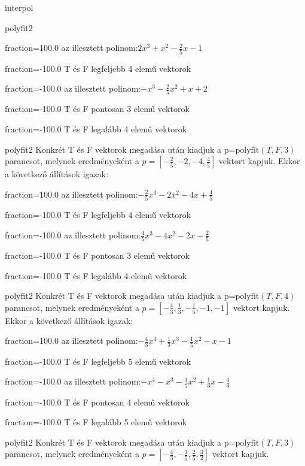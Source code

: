 \documentclass[12pt]{article}
\begin{document}
\begin{quiz}{interpol}
\begin{multi}[multiple]{polyfit2}
\item[fraction=100.0] az illesztett polinom:$2x^3+x^2-\frac{2}{5}x-1$
\item[fraction=-100.0]  T és F legfeljebb 4 elemű vektorok
\item[fraction=-100.0]  az illesztett polinom:$-x^3-\frac{2}{5}x^2+x+2$
\item[fraction=-100.0]  T és F pontosan 3 elemű vektorok
\item[fraction=-100.0] T és F legalább 4 elemű vektorok
\end{multi}
\begin{multi}[multiple]{polyfit2}
Konkrét T és F vektorok megadása után kiadjuk a p=$\mathrm{polyfit}(T,F,3)$
parancsot, melynek eredményeként a $p=\left[-\frac{2}{5},-2,-4,\frac{4}{5}\right]$ vektort kapjuk.
Ekkor a következő állítások igazak:
\item[fraction=100.0] az illesztett polinom:$-\frac{2}{5}x^3-2x^2-4x+\frac{4}{5}$
\item[fraction=-100.0]  T és F legfeljebb 4 elemű vektorok
\item[fraction=-100.0]  az illesztett polinom:$\frac{4}{5}x^3-4x^2-2x-\frac{2}{5}$
\item[fraction=-100.0]  T és F pontosan 3 elemű vektorok
\item[fraction=-100.0] T és F legalább 4 elemű vektorok
\end{multi}
\begin{multi}[multiple]{polyfit2}
Konkrét T és F vektorok megadása után kiadjuk a p=$\mathrm{polyfit}(T,F,4)$
parancsot, melynek eredményeként a $p=\left[-\frac{4}{3},\frac{1}{3},-\frac{1}{5},-1,-1\right]$ vektort kapjuk.
Ekkor a következő állítások igazak:
\item[fraction=100.0] az illesztett polinom:$-\frac{4}{3}x^4+\frac{1}{3}x^3-\frac{1}{5}x^2-x-1$
\item[fraction=-100.0]  T és F legfeljebb 5 elemű vektorok
\item[fraction=-100.0]  az illesztett polinom:$-x^4-x^3-\frac{1}{5}x^2+\frac{1}{3}x-\frac{4}{3}$
\item[fraction=-100.0]  T és F pontosan 4 elemű vektorok
\item[fraction=-100.0] T és F legalább 5 elemű vektorok
\end{multi}
\begin{multi}[multiple]{polyfit2}
Konkrét T és F vektorok megadása után kiadjuk a p=$\mathrm{polyfit}(T,F,3)$
parancsot, melynek eredményeként a $p=\left[-\frac{4}{3},-\frac{3}{5},\frac{2}{5},\frac{3}{2}\right]$ vektort kapjuk.

\end{multi}
\end{quiz}
\end{document}
